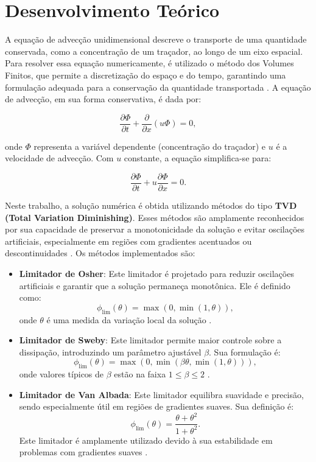 \section{Desenvolvimento Teórico}

A equação de advecção unidimensional descreve o transporte de uma quantidade conservada, como a concentração de um traçador, ao longo de um eixo espacial. Para resolver essa equação numericamente, é utilizado o método dos Volumes Finitos, que permite a discretização do espaço e do tempo, garantindo uma formulação adequada para a conservação da quantidade transportada \cite{leveque2002finite}. A equação de advecção, em sua forma conservativa, é dada por:

\begin{equation}
    \frac{\partial \Phi}{\partial t} + \frac{\partial}{\partial x} (u \Phi) = 0,
\end{equation}

onde $\Phi$ representa a variável dependente (concentração do traçador) e $u$ é a velocidade de advecção. Com $u$ constante, a equação simplifica-se para:

\begin{equation}
    \frac{\partial \Phi}{\partial t} + u \frac{\partial \Phi}{\partial x} = 0.
\end{equation}

Neste trabalho, a solução numérica é obtida utilizando métodos do tipo \textbf{TVD (Total Variation Diminishing)}. Esses métodos são amplamente reconhecidos por sua capacidade de preservar a monotonicidade da solução e evitar oscilações artificiais, especialmente em regiões com gradientes acentuados ou descontinuidades \cite{harten1983high}. Os métodos implementados são:

\begin{itemize}
    \item \textbf{Limitador de Osher}: Este limitador é projetado para reduzir oscilações artificiais e garantir que a solução permaneça monotônica. Ele é definido como:
          \[
              \phi_{\text{lim}}(\theta) = \max(0, \min(1, \theta)),
          \]
          onde $\theta$ é uma medida da variação local da solução \cite{osher1984rktvd}.

    \item \textbf{Limitador de Sweby}: Este limitador permite maior controle sobre a dissipação, introduzindo um parâmetro ajustável $\beta$. Sua formulação é:
          \[
              \phi_{\text{lim}}(\theta) = \max(0, \min(\beta \theta, \min(1, \theta))),
          \]
          onde valores típicos de $\beta$ estão na faixa $1 \leq \beta \leq 2$ \cite{sweby1984high}.

    \item \textbf{Limitador de Van Albada}: Este limitador equilibra suavidade e precisão, sendo especialmente útil em regiões de gradientes suaves. Sua definição é:
          \[
              \phi_{\text{lim}}(\theta) = \frac{\theta + \theta^2}{1 + \theta^2}.
          \]
          Este limitador é amplamente utilizado devido à sua estabilidade em problemas com gradientes suaves \cite{vanalbada1982family}.
\end{itemize}

